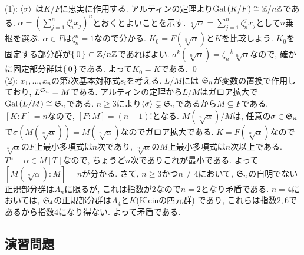 \begin{egans}
(1): $\langle \sigma \rangle$ は$K/F$に忠実に作用する. アルティンの定理より$\operatorname{Gal}{(K/F)}\cong \mathbb{Z}/n\mathbb{Z}$である. $\alpha = (\sum_{j=1}^{n} \zeta_n^j x_j)^n$とおくとよいことを示す. $\sqrt[n]{\alpha} = \sum_{j=1}^{n} \zeta_n^j x_j$として$n$乗根を選ぶ. $\alpha\in F$は$\zeta_n^n = 1$なので分かる. $K_0 = F(\sqrt[n]{\alpha})$と$K$を比較しよう. $K_0$を固定する部分群が$\set{0}\subset \mathbb{Z}/n\mathbb{Z}$であればよい. $\sigma^k(\sqrt[n]{\alpha}) = \zeta_n^{-k}\sqrt[n]{\alpha}$なので, 確かに固定部分群は$\set{0}$である. よって$K_0 = K$である. \qed \\
(2): $x_1,\dots, x_n$の第$i$次基本対称式$s_i$を考える. $L/M$には $\mathfrak{S}_n$が変数の置換で作用しており, $L^{\mathfrak{S}_n} = M$である. アルティンの定理から$L/M$はガロア拡大で$\operatorname{Gal}{(L/M)}\cong \mathfrak{S}_n$である. $n\geq 3$により$\langle \sigma \rangle \subsetneq \mathfrak{S}_n$であるから$M\subsetneq F$である. $[K:F] = n$なので, $[F:M] = (n-1)!$となる. $M(\sqrt[n]{\alpha})/M$は, 任意の$\sigma\in \mathfrak{S}_n$で$\sigma(M(\sqrt[n]{\alpha})) = M(\sqrt[n]{\alpha})$なのでガロア拡大である. $K=F(\sqrt[n]{\alpha})$なので$\sqrt[n]{\alpha}$の$F$上最小多項式は$n$次であり, $\sqrt[n]{\alpha}$の$M$上最小多項式は$n$次以上である. $T^n - \alpha \in M[T]$なので, ちょうど$n$次でありこれが最小である. よって$[M(\sqrt[n]{\alpha}):M] = n$が分かる. さて,  $n\geq 3$かつ$n\neq 4$において, $\mathfrak{S}_n$の自明でない正規部分群は$A_n$に限るが, これは指数が$2$なので$n=2$となり矛盾である. $n=4$においては, $\mathfrak{S}_{4}$の正規部分群は$A_4$と$K$(Kleinの四元群) であり, これらは指数$2,6$であるから指数$4$になり得ない. よって矛盾である.

\end{egans}


\subsection{演習問題}
